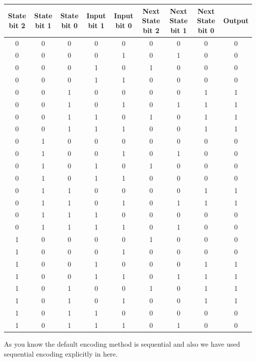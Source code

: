 \documentclass[paper=b4, fontsize=11pt]{scrartcl} %
\numberwithin{equation}{section} %
\numberwithin{figure}{section} %
\numberwithin{table}{section} %
\begin{document}
\begin{tabular}{|c|c|c|c|c|c|c|c|c|}
    \hline
    State bit 2 & State bit 1 & State bit 0 & Input bit 1 & Input bit 0 & Next State bit 2 & Next State bit 1 & Next State bit 0 & Output \\ \hline
    0 & 0 & 0 & 0 & 0 & 0 & 0 & 0 & 0 \\ \hline
    0 & 0 & 0 & 0 & 1 & 0 & 1 & 0 & 0 \\ \hline
    0 & 0 & 0 & 1 & 0 & 1 & 0 & 0 & 0 \\ \hline
    0 & 0 & 0 & 1 & 1 & 0 & 0 & 0 & 0 \\ \hline
    0 & 0 & 1 & 0 & 0 & 0 & 0 & 1 & 1 \\ \hline
    0 & 0 & 1 & 0 & 1 & 0 & 1 & 1 & 1 \\ \hline
    0 & 0 & 1 & 1 & 0 & 1 & 0 & 1 & 1 \\ \hline
    0 & 0 & 1 & 1 & 1 & 0 & 0 & 1 & 1 \\ \hline
    0 & 1 & 0 & 0 & 0 & 0 & 0 & 0 & 0 \\ \hline
    0 & 1 & 0 & 0 & 1 & 0 & 1 & 0 & 0 \\ \hline
    0 & 1 & 0 & 1 & 0 & 1 & 0 & 0 & 0 \\ \hline
    0 & 1 & 0 & 1 & 1 & 0 & 0 & 0 & 0 \\ \hline
    0 & 1 & 1 & 0 & 0 & 0 & 0 & 1 & 1 \\ \hline
    0 & 1 & 1 & 0 & 1 & 0 & 1 & 1 & 1 \\ \hline
    0 & 1 & 1 & 1 & 0 & 0 & 0 & 0 & 0 \\ \hline
    0 & 1 & 1 & 1 & 1 & 0 & 1 & 0 & 0 \\ \hline
    1 & 0 & 0 & 0 & 0 & 1 & 0 & 0 & 0 \\ \hline
    1 & 0 & 0 & 0 & 1 & 0 & 0 & 0 & 0 \\ \hline
    1 & 0 & 0 & 1 & 0 & 0 & 0 & 1 & 1 \\ \hline
    1 & 0 & 0 & 1 & 1 & 0 & 1 & 1 & 1 \\ \hline
    1 & 0 & 1 & 0 & 0 & 1 & 0 & 1 & 1 \\ \hline
    1 & 0 & 1 & 0 & 1 & 0 & 0 & 1 & 1 \\ \hline
    1 & 0 & 1 & 1 & 0 & 0 & 0 & 0 & 0 \\ \hline
    1 & 0 & 1 & 1 & 1 & 0 & 1 & 0 & 0 \\ \hline
\end{tabular}

As you know the default encoding method is sequential and also we have
used sequential encoding explicitly in here.
\end{document}
